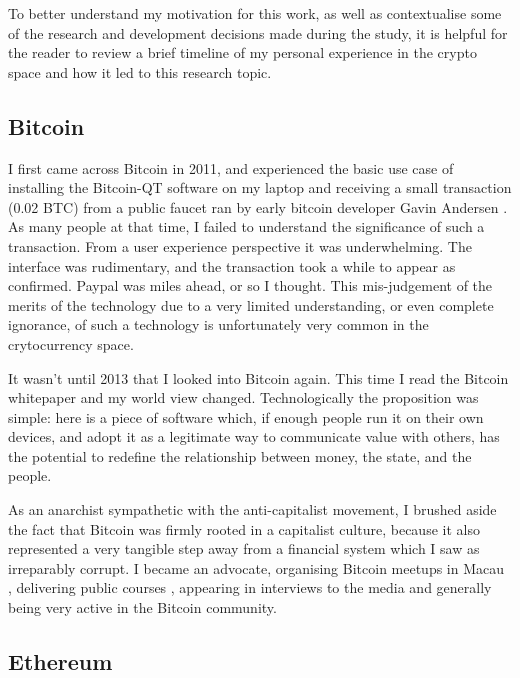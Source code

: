 To better understand my motivation for this work, as well as contextualise some of the research and development decisions made during the study, it is helpful for the reader to review a brief timeline of my personal experience in the crypto space and how it led to this research topic.

\subsection{Bitcoin}

I first came across Bitcoin in 2011, and experienced the basic use case of installing the Bitcoin-QT software on my laptop and receiving a small transaction (0.02 BTC) from a public faucet ran by early bitcoin developer Gavin Andersen \cite{lucasHowGavinAndresen2022}. As many people at that time, I failed to understand the significance of such a transaction. From a user experience perspective it was underwhelming.  The interface was rudimentary, and the transaction took a while to appear as confirmed. Paypal was miles ahead, or so I thought. This mis-judgement of the merits of the technology due to a very limited understanding, or even complete ignorance, of such a technology is unfortunately very common in the crytocurrency space.

It wasn't until 2013 that I looked into Bitcoin again. This time I read the Bitcoin whitepaper \cite{nakamotoBitcoinPeertopeerElectronic2008} and my world view changed. Technologically the proposition was simple: here is a piece of software which, if enough people run it on their own devices, and adopt it as a legitimate way to communicate value with others, has the potential to redefine the relationship between money, the state, and the people.

As an anarchist sympathetic with the anti-capitalist movement, I brushed aside the fact that Bitcoin was firmly rooted in a capitalist culture, because it also represented a very tangible step away from a financial system which I saw as irreparably corrupt. I became an advocate, organising Bitcoin meetups in Macau \cite{BitcoinMacau2024}, delivering public courses \cite{mouraUSJHoldCourse2021}, appearing in interviews to the media \cite{tdmportuguesenewsprogramsReportagemJornalistaLina2015} \cite{reisBitcoinDuasFaces2017} and generally being very active in the Bitcoin community.

\subsection{Ethereum}

